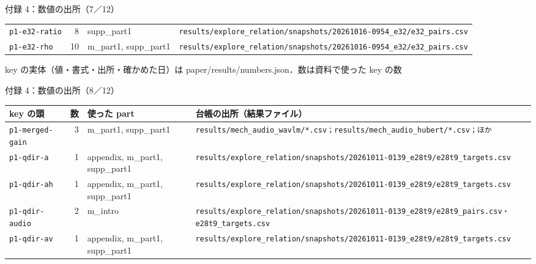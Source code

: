 \begin{frame}{付録 4：数値の出所（7／12）}
\begin{tabularx}{\textwidth}{@{}l r l X@{}}
    \texttt{p1-e32-ratio} & 8 & supp\_part1 & \texttt{results/\allowbreak{}explore\_\allowbreak{}relation/\allowbreak{}snapshots/\allowbreak{}20261016-0954\_\allowbreak{}e32/\allowbreak{}e32\_\allowbreak{}pairs.csv} \\
    \texttt{p1-e32-rho} & 10 & m\_part1, supp\_part1 & \texttt{results/\allowbreak{}explore\_\allowbreak{}relation/\allowbreak{}snapshots/\allowbreak{}20261016-0954\_\allowbreak{}e32/\allowbreak{}e32\_\allowbreak{}pairs.csv} \\
    \bottomrule
  \end{tabularx}\par
  {\raggedright\tiny key の実体（値・書式・出所・確かめた日）は paper/results/numbers.json．数は資料で使った key の数\par}
\end{frame}
\begin{frame}{付録 4：数値の出所（8／12）}
  \vspace{-0.3em}\centering\tiny\renewcommand{\arraystretch}{1.0}
  \begin{tabularx}{\textwidth}{@{}l r l X@{}}
    \toprule key の頭 & 数 & 使った part & 台帳の出所（結果ファイル） \\ \midrule
    \texttt{p1-merged-gain} & 3 & m\_part1, supp\_part1 & \texttt{results/\allowbreak{}mech\_\allowbreak{}audio\_\allowbreak{}wavlm/\allowbreak{}*.csv；results/\allowbreak{}mech\_\allowbreak{}audio\_\allowbreak{}hubert/\allowbreak{}*.csv；ほか} \\
    \texttt{p1-qdir-a} & 1 & appendix, m\_part1, supp\_part1 & \texttt{results/\allowbreak{}explore\_\allowbreak{}relation/\allowbreak{}snapshots/\allowbreak{}20261011-0139\_\allowbreak{}e28t9/\allowbreak{}e28t9\_\allowbreak{}targets.csv} \\
    \texttt{p1-qdir-ah} & 1 & appendix, m\_part1, supp\_part1 & \texttt{results/\allowbreak{}explore\_\allowbreak{}relation/\allowbreak{}snapshots/\allowbreak{}20261011-0139\_\allowbreak{}e28t9/\allowbreak{}e28t9\_\allowbreak{}targets.csv} \\
    \texttt{p1-qdir-audio} & 2 & m\_intro & \texttt{results/\allowbreak{}explore\_\allowbreak{}relation/\allowbreak{}snapshots/\allowbreak{}20261011-0139\_\allowbreak{}e28t9/\allowbreak{}e28t9\_\allowbreak{}pairs.csv・e28t9\_\allowbreak{}targets.csv} \\
    \texttt{p1-qdir-av} & 1 & appendix, m\_part1, supp\_part1 & \texttt{results/\allowbreak{}explore\_\allowbreak{}relation/\allowbreak{}snapshots/\allowbreak{}20261011-0139\_\allowbreak{}e28t9/\allowbreak{}e28t9\_\allowbreak{}targets.csv} \\

\end{tabularx}
\end{frame}
